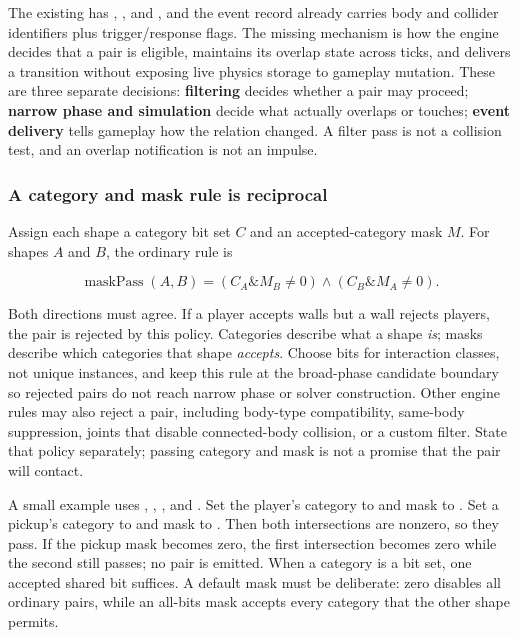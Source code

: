 \hypertarget{05-engine-i-ch017-decide-which-pairs-may-interact-then-publish-overlap-transitions-safely}{}

The existing  has , , and , and the event record already carries body and collider identifiers plus trigger/response flags. The missing mechanism is how the engine decides that a pair is eligible, maintains its overlap state across ticks, and delivers a transition without exposing live physics storage to gameplay mutation. These are three separate decisions: \textbf{filtering} decides whether a pair may proceed; \textbf{narrow phase and simulation} decide what actually overlaps or touches; \textbf{event delivery} tells gameplay how the relation changed. A filter pass is not a collision test, and an overlap notification is not an impulse.

\subsubsection{A category and mask rule is reciprocal}\label{05-engine-i-ch017-a-category-and-mask-rule-is-reciprocal}

\hypertarget{05-engine-i-ch017-a-category-and-mask-rule-is-reciprocal}{}

Assign each shape a category bit set \(C\) and an accepted-category mask \(M\). For shapes \(A\) and \(B\), the ordinary rule is

\[
\operatorname{maskPass}(A,B) = (C_A \mathbin{\&} M_B \ne 0) \land (C_B \mathbin{\&} M_A \ne 0).
\]

Both directions must agree. If a player accepts walls but a wall rejects players, the pair is rejected by this policy. Categories describe what a shape \emph{is}; masks describe which categories that shape \emph{accepts}. Choose bits for interaction classes, not unique instances, and keep this rule at the broad-phase candidate boundary so rejected pairs do not reach narrow phase or solver construction. Other engine rules may also reject a pair, including body-type compatibility, same-body suppression, joints that disable connected-body collision, or a custom filter. State that policy separately; passing category and mask is not a promise that the pair will contact.

A small example uses , , , and . Set the player's category to  and mask to . Set a pickup's category to  and mask to . Then both intersections are nonzero, so they pass. If the pickup mask becomes zero, the first intersection becomes zero while the second still passes; no pair is emitted. When a category is a bit set, one accepted shared bit suffices. A default mask must be deliberate: zero disables all ordinary pairs, while an all-bits mask accepts every category that the other shape permits.

